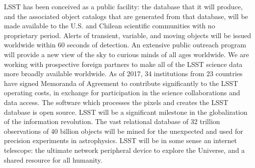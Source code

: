 
LSST has been conceived as a public facility: the database that it will
produce, and the associated object catalogs that are generated from that
database, will be made available to the U.S. and Chilean
scientific communities with no proprietary period.
Alerts of transient, variable, and moving objects will be issued worldwide within
60 seconds of detection.
An extensive public outreach program will provide a new view of the sky to
curious minds of all ages worldwide.
We are working with prospective foreign partners to make all of the LSST science data more broadly available worldwide.  As of 2017, 34 institutions from 23 countries
have signed Memoranda of Agreement to contribute significantly to
the LSST operating costs, in exchange for participation in the science collaborations
and data access.  The software which processes the pixels
and creates the LSST database is open source.
LSST will be a significant milestone in the globalization of the information revolution.
The vast relational database of 32 trillion observations of 40 billion objects
will be mined for the unexpected and used for precision experiments in astrophysics.
LSST will be in some sense an internet telescope:
the ultimate network peripheral device to explore the Universe, and
a shared resource for all humanity.
